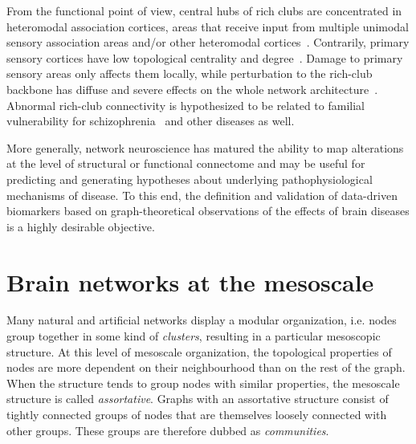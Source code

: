 From the functional point of view, central hubs of rich clubs are concentrated in heteromodal association cortices, areas that receive input from multiple unimodal sensory association areas and/or other heteromodal cortices~\cite{sporns2007,power2013,kandel2013}.
Contrarily, primary sensory cortices have low topological centrality and degree~\cite{vandenheuvel2011,zamora-lopez2010,harriger2012}.
Damage to primary sensory areas only affects them locally, while perturbation to the rich-club backbone has diffuse and severe effects on the whole network architecture~\cite{honey2008,ball2014}.
Abnormal rich-club connectivity is hypothesized to be related to familial vulnerability for schizophrenia~\cite{collin2014impaired} and other diseases as well.

More generally, network neuroscience has matured the ability to map alterations at the level of structural or functional connectome and may be useful for predicting and generating hypotheses about underlying pathophysiological mechanisms of disease.
To this end, the definition and validation of data-driven biomarkers based on graph-theoretical observations of the effects of brain diseases is a highly desirable objective.

\section{Brain networks at the mesoscale}
Many natural and artificial networks display a modular organization, i.e. nodes group together in some kind of \emph{clusters}, resulting in a particular mesoscopic structure.
At this level of mesoscale organization, the topological properties of nodes are more dependent on their neighbourhood than on the rest of the graph.
When the structure tends to group nodes with similar properties, the mesoscale structure is called \emph{assortative}.
Graphs with an assortative structure consist of tightly connected groups of nodes that are themselves loosely connected with other groups.
These groups are therefore dubbed as \emph{communities}.

